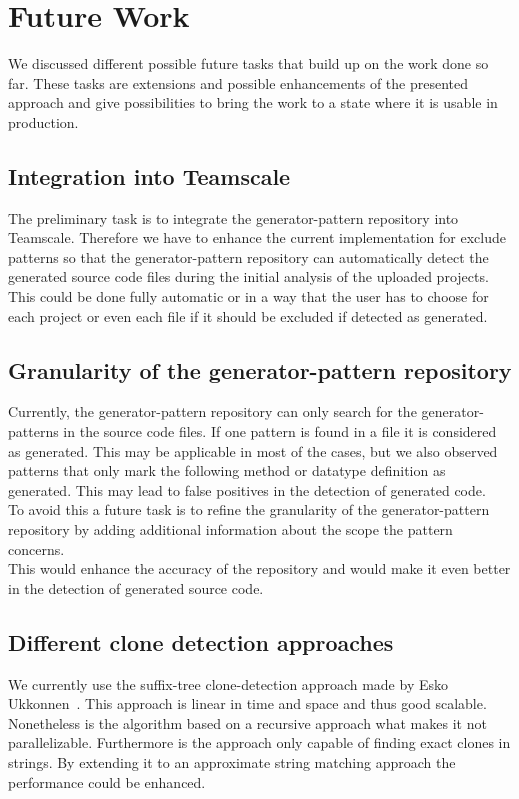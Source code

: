 
\chapter{Future Work}\label{chapter:future}
We discussed different possible future tasks that build up on the work done so far. These tasks are extensions and possible enhancements of the presented approach and give possibilities to bring the work to a state where it is usable in production.

\section{Integration into Teamscale}
The preliminary task is to integrate the generator-pattern repository into Teamscale. Therefore we have to enhance the current implementation for exclude patterns so that the generator-pattern repository can automatically detect the generated source code files during the initial analysis of the uploaded projects. This could be done fully automatic or in a way that the user has to choose for each project or even each file if it should be excluded if detected as generated.

\section{Granularity of the generator-pattern repository}
Currently, the generator-pattern repository can only search for the generator-patterns in the source code files. If one pattern is found in a file it is considered as generated. This may be applicable in most of the cases, but we also observed patterns that only mark the following method or datatype definition as generated. This may lead to false positives in the detection of generated code.\\
To avoid this a future task is to refine the granularity of the generator-pattern repository by adding additional information about the scope the pattern concerns. \\
This would enhance the accuracy of the repository and would make it even better in the detection of generated source code.

\section{Different clone detection approaches}
We currently use the suffix-tree clone-detection approach made by Esko Ukkonnen~\cite{Ukkonen1995}. This approach is linear in time and space and thus good scalable.\\
Nonetheless is the algorithm based on a recursive approach what makes it not parallelizable. Furthermore is the approach only capable of finding exact clones in strings. By extending it to an approximate string matching approach the performance could be enhanced.

